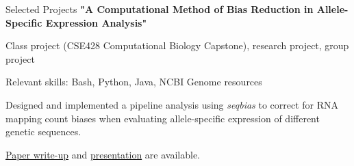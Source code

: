 \begin{rubric}{Selected Projects}
\entry*[2019] %
	\textbf{"A Computational Method of Bias Reduction in Allele-Specific Expression Analysis"}
	\par Class project (CSE428 Computational Biology Capstone), research project, group project
	\par Relevant skills: Bash, Python, Java, NCBI Genome resources
	\par Designed and implemented a pipeline analysis using \textit{seqbias} to correct for RNA mapping count biases when evaluating allele-specific expression of different genetic sequences. 
	\par \href{https://github.com/cephcyn/cephcyn.github.io/raw/master/documents/u_cse428/ASE_Report.pdf}{Paper write-up} and \href{https://github.com/cephcyn/cephcyn.github.io/raw/master/documents/u_cse428/ASE_Presentation.pptx}{presentation} are available.

\end{rubric}
